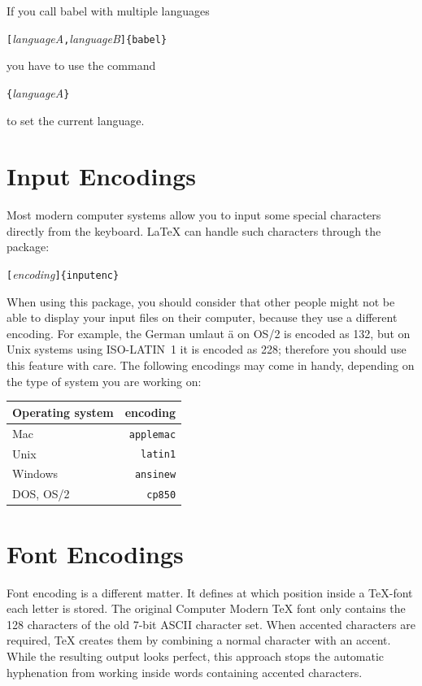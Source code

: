 \documentclass[twoside,letterpaper,11pt]{article}
\begin{document}
If you call babel with multiple languages
\begin{lscommand}
\verb|[|\emph{languageA}\verb|,|\emph{languageB}\verb|]{babel}| 
\end{lscommand}
\noindent you have to use the command
\begin{lscommand}
\verb|{|\emph{languageA}\verb|}|
\end{lscommand}
\noindent to set the current language.

\section{Input Encodings}

Most modern computer systems allow you to input some special characters
directly from the keyboard. \LaTeX{} can handle such characters through the
 package:
\begin{lscommand}
\verb|[|\emph{encoding}\verb|]{inputenc}| 
\end{lscommand}

When using this package, you should consider
that other people might not be able to display your input files on
their computer, because they use a different encoding. For example,
the German umlaut \"a on OS/2 is encoded as 132, but on Unix
systems using ISO-LATIN~1 it is encoded as 228; therefore you should
use this feature with care. The following encodings may come in handy,
depending on the type of system you are working on: 

\begin{center}
\begin{tabular}{l | r}
Operating system & encoding\\
\hline
Mac     &  \texttt{applemac} \\
Unix    &  \texttt{latin1} \\ 
Windows &  \texttt{ansinew} \\
DOS, OS/2    &  \texttt{cp850}
\end{tabular}
\end{center}

\section{Font Encodings}

Font encoding is a different matter. It defines at which position inside
a \TeX-font each letter is stored. The original Computer Modern
\TeX{} font only contains the 128 characters of the old 7-bit ASCII
character set. When accented characters are required, \TeX{} creates
them by combining a normal character with an accent. While the
resulting output looks perfect, this approach stops the automatic
hyphenation from working inside words containing accented characters.
\end{document}
